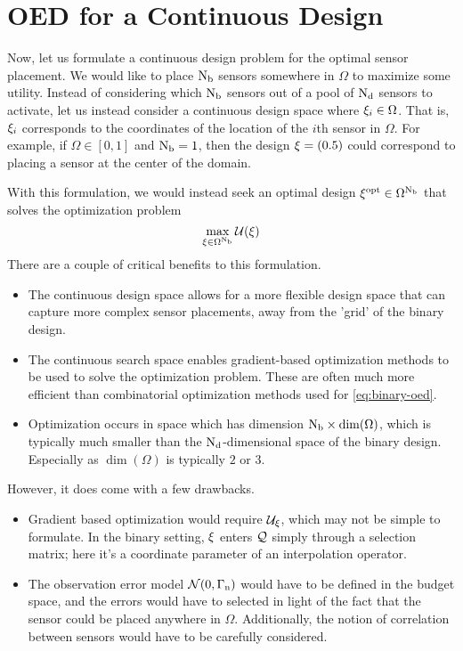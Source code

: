 \documentclass[a4paper,11pt]{article}
\begin{document}
\section{OED for a Continuous Design}
\label{sec:continuous-oed}
Now, let us formulate a continuous design problem for the optimal sensor placement. We
would like to place ${\rm N_{b}}$ sensors somewhere in $\Omega$ to maximize some utility.
Instead of considering which ${\rm N_{b}}$ sensors out of a pool of ${\rm N_{d}}$ sensors to
activate, let us instead consider a continuous design space where $\xi_i \in
\Omega$. That is, $\xi_i$ corresponds to the coordinates of the location of the
$i$th sensor in $\Omega$. For example, if $\Omega \in [0,1]$ and ${\rm N_{b}} = 1$, then
the design $\xi = (0.5)$ could correspond to placing a sensor at the center of the
domain.

With this formulation, we would instead seek an optimal design $\xi^{\rm opt} \in
\Omega^{{\rm N_{b}}}$ that solves the optimization problem
\begin{equation}
  \label{eq:continuous-oed}
  \max_{\xi \in \Omega^{{\rm N_{b}}}} \mathcal{U}(\xi)
\end{equation}
There are a couple of critical benefits to this formulation. 
\begin{itemize}
  \item The continuous design space allows for a more flexible design space that can
    capture more complex sensor placements, away from the 'grid' of the binary design.
  \item The continuous search space enables gradient-based optimization methods to be
    used to solve the optimization problem. These are often much more efficient than
    combinatorial optimization methods used for \cref{eq:binary-oed}.
  \item Optimization occurs in space which has dimension ${\rm N_{b}} \times \dim(\Omega)$,
    which is typically much smaller than the ${\rm N_{d}}$-dimensional space of the binary
    design. Especially as $\dim(\Omega)$ is typically $2$ or $3$.
\end{itemize}
However, it does come with a few drawbacks.
\begin{itemize}
  \item Gradient based optimization would require $\mathcal{U}_{\xi}$, which may not be
    simple to formulate. In the binary setting, $\xi$ enters $\mathcal{Q}$ simply through a
    selection matrix; here it's a coordinate parameter of an interpolation operator.
  \item The observation error model $\mathcal{N}(0, \Gamma_{\rm n})$ would have to be defined
    in the budget space, and the errors would have to selected in light of the fact that
    the sensor could be placed anywhere in $\Omega$. Additionally, the notion of
    correlation between sensors would have to be carefully considered.
\end{itemize}

%

\printbibliography
\end{document}
